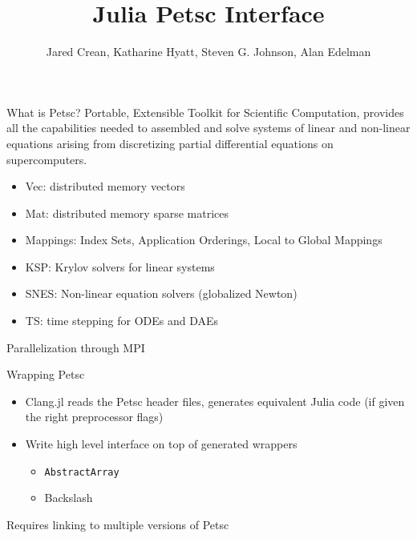 \documentclass{beamer}
\title{Julia Petsc Interface}
\author[]{Jared Crean, Katharine Hyatt, Steven G. Johnson, Alan Edelman}
\begin{document}
\begin{frame}
\titlepage
\end{frame}

\begin{frame}{What is Petsc?}
Portable, Extensible Toolkit for Scientific Computation, provides all the 
capabilities needed to assembled and solve systems of linear and non-linear 
equations
arising from discretizing partial differential equations on supercomputers.
\begin{itemize}
  \item Vec: distributed memory vectors 
  \item Mat: distributed memory sparse matrices
  \item Mappings: Index Sets, Application Orderings, Local to Global Mappings
  \item KSP: Krylov solvers for linear systems
  \item SNES: Non-linear equation solvers (globalized Newton)
  \item TS: time stepping for ODEs and DAEs
\end{itemize}
Parallelization through MPI
\end{frame}


\begin{frame}{Wrapping Petsc}

\begin{itemize}
  \item Clang.jl reads the Petsc header files, generates equivalent Julia code (if given the right preprocessor flags)
  \item Write high level interface on top of generated wrappers
    \begin{itemize}
      \item \texttt{AbstractArray}
      \item Backslash
    \end{itemize}
\end{itemize}
\hfill

Requires linking to multiple versions of Petsc

\end{frame}
\end{document}

